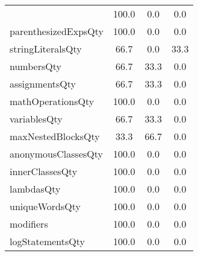 \begin{tabular}{lccc}
{tryCatchQty & 100.0 & 0.0 & 0.0 \\
parenthesizedExpsQty & 100.0 & 0.0 & 0.0 \\
stringLiteralsQty & 66.7 & 0.0 & 33.3 \\
numbersQty & 66.7 & 33.3 & 0.0 \\
assignmentsQty & 66.7 & 33.3 & 0.0 \\
mathOperationsQty & 100.0 & 0.0 & 0.0 \\
variablesQty & 66.7 & 33.3 & 0.0 \\
maxNestedBlocksQty & 33.3 & 66.7 & 0.0 \\
anonymousClassesQty & 100.0 & 0.0 & 0.0 \\
innerClassesQty & 100.0 & 0.0 & 0.0 \\
lambdasQty & 100.0 & 0.0 & 0.0 \\
uniqueWordsQty & 100.0 & 0.0 & 0.0 \\
modifiers & 100.0 & 0.0 & 0.0 \\
logStatementsQty & 100.0 & 0.0 & 0.0 \\
\bottomrule
              \end{tabular}
            